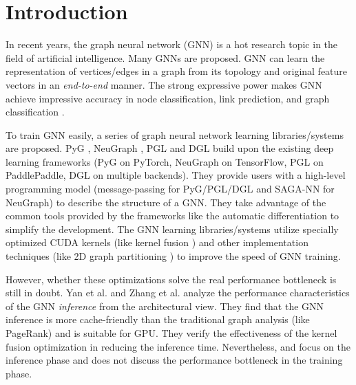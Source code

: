 \section{Introduction}

In recent years, the graph neural network (GNN) is a hot research topic in the field of artificial intelligence.
Many GNNs \cite{kipf2017_gcn, defferrad2016_chebnet, li2018_agcn,li2015_ggnn, hamilton2017_graphsage, huang2018_gat, zhang2018_gaan} are proposed.
GNN can learn the representation of vertices/edges in a graph from its topology and original feature vectors in an \emph{end-to-end} manner.
The strong expressive power makes GNN achieve impressive accuracy in node classification, link prediction, and graph classification \cite{zhou2018_gnn_review, zhang2018_gnn_survey, comprehensive-survey-wu-2020}.

To train GNN easily, a series of graph neural network learning libraries/systems \cite{PyG, DGL, ma2019_neugraph, zhu2019_aligraph, PGL} are proposed.
PyG \cite{PyG}, NeuGraph \cite{ma2019_neugraph}, PGL \cite{PGL} and DGL \cite{DGL} build upon the existing deep learning frameworks (PyG on PyTorch, NeuGraph on TensorFlow, PGL on PaddlePaddle, DGL on multiple backends).
They provide users with a high-level programming model (message-passing for PyG/PGL/DGL and SAGA-NN for NeuGraph) to describe the structure of a GNN.
They take advantage of the common tools provided by the frameworks like the automatic differentiation to simplify the development.
The GNN learning libraries/systems utilize specially optimized CUDA kernels (like kernel fusion \cite{DGL} \cite{ma2019_neugraph}) and other implementation techniques (like 2D graph partitioning \cite{ma2019_neugraph}) to improve the speed of GNN training.

However, whether these optimizations solve the real performance bottleneck is still in doubt.
Yan et al. \cite{yan2020_characterizing_gcn} and Zhang et al. \cite{zhang2020_analysis_neugraph} analyze the performance characteristics of the GNN \emph{inference} from the architectural view.
They find that the GNN inference is more cache-friendly than the traditional graph analysis (like PageRank) and is suitable for GPU.
They verify the effectiveness of the kernel fusion optimization in reducing the inference time.
Nevertheless, \cite{yan2020_characterizing_gcn} and \cite{zhang2020_analysis_neugraph} focus on the inference phase and does not discuss the performance bottleneck in the training phase.


